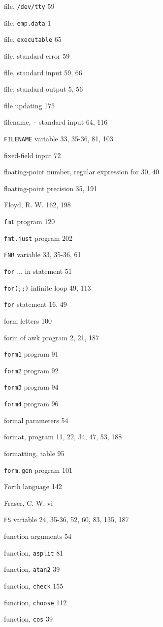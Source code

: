 \begin{multicols}{2}
file, \verb'/dev/tty' 59

file, \verb'emp.data' 1

file, \verb'executable' 65

file, standard error 59

file, standard input 59, 66

file, standard output 5, 56

file updating 175

filename, \verb'-' standard input 64, 116

\verb'FILENAME' variable 33, 35-36, 81, 103

fixed-field input 72

floating-point number, regular expression for 30, 40

floating-point precision 35, 191

Floyd, R. W. 162, 198

\verb'fmt' program 120

\verb'fmt.just' program 202

\verb'FNR' variable 33, 35-36, 61

\verb'for' ... in statement 51

\verb'for(;;)' infinite loop 49, 113

\verb'for' statement 16, 49

form letters 100

form of awk program 2, 21, 187

\verb'form1' program 91

\verb'form2' program 92

\verb'form3' program 94

\verb'form4' program 96

formal parameters 54

format, program 11, 22, 34, 47, 53, 188

formatting, table 95

\verb'form.gen' program 101

Forth language 142

Fraser, C. W. vi

\verb'FS' variable 24, 35-36, 52, 60, 83, 135, 187

function arguments 54

function, \verb'asplit' 81

function, \verb'atan2' 39

function, \verb'check' 155

function, \verb'choose' 112

function, \verb'cos' 39


\end{multicols}
